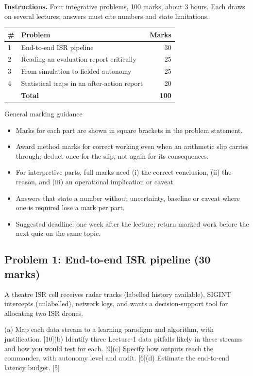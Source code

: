 \documentclass[11pt]{article}
\begin{document}
\textbf{Instructions.} Four integrative problems, 100 marks, about 3 hours. Each draws on several lectures; answers must cite numbers and state limitations.

\begin{center}\small\renewcommand{\arraystretch}{1.25}\begin{tabularx}{0.85\textwidth}{@{}l X r@{}}\toprule\textbf{\#} & \textbf{Problem} & \textbf{Marks}\\\midrule1 & End-to-end ISR pipeline & 30\\
2 & Reading an evaluation report critically & 25\\
3 & From simulation to fielded autonomy & 25\\
4 & Statistical traps in an after-action report & 20\\\midrule & \textbf{Total} & \textbf{100}\\\bottomrule\end{tabularx}\end{center}

\begin{instr}{General marking guidance}\begin{itemize}
\item Marks for each part are shown in square brackets in the problem statement.
\item Award method marks for correct working even when an arithmetic slip carries through; deduct once for the slip, not again for its consequences.
\item For interpretive parts, full marks need (i) the correct conclusion, (ii) the reason, and (iii) an operational implication or caveat.
\item Answers that state a number without uncertainty, baseline or caveat where one is required lose a mark per part.
\item Suggested deadline: one week after the lecture; return marked work before the next quiz on the same topic.
\end{itemize}\end{instr}

\subsection{Problem 1: End-to-end ISR pipeline \normalfont\small\color{GreyN}(30 marks)}

\begin{prob}A theatre ISR cell receives radar tracks (labelled history available), SIGINT intercepts (unlabelled), network logs, and wants a decision-support tool for allocating two ISR drones.

(a) Map each data stream to a learning paradigm and algorithm, with justification. [10]\newline (b) Identify three Lecture-1 data pitfalls likely in these streams and how you would test for each. [9]\newline (c) Specify how outputs reach the commander, with autonomy level and audit. [6]\newline (d) Estimate the end-to-end latency budget. [5]\end{prob}
\end{document}
